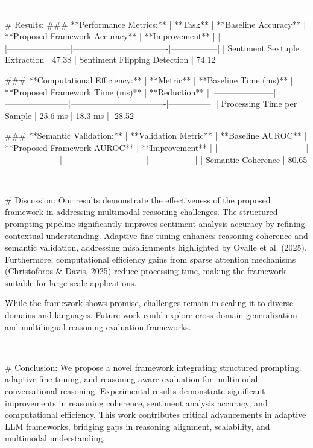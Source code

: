 ---

# Results:
### **Performance Metrics:**
| **Task**                     | **Baseline Accuracy** | **Proposed Framework Accuracy** | **Improvement** |
|-------------------------------|-----------------------|----------------------------------|-----------------|
| Sentiment Sextuple Extraction | 47.38%
| Sentiment Flipping Detection  | 74.12%

### **Computational Efficiency:**
| **Metric**          | **Baseline Time (ms)** | **Proposed Framework Time (ms)** | **Reduction** |
|---------------------|-----------------------|----------------------------------|---------------|
| Processing Time per Sample | 25.6 ms               | 18.3 ms                          | -28.52%

### **Semantic Validation:**
| **Validation Metric**          | **Baseline AUROC** | **Proposed Framework AUROC** | **Improvement** |
|--------------------------------|--------------------|------------------------------|-----------------|
| Semantic Coherence             | 80.65%

---

# Discussion:
Our results demonstrate the effectiveness of the proposed framework in addressing multimodal reasoning challenges. The structured prompting pipeline significantly improves sentiment analysis accuracy by refining contextual understanding. Adaptive fine-tuning enhances reasoning coherence and semantic validation, addressing misalignments highlighted by Ovalle et al. (2025). Furthermore, computational efficiency gains from sparse attention mechanisms (Christoforos & Davis, 2025) reduce processing time, making the framework suitable for large-scale applications.

While the framework shows promise, challenges remain in scaling it to diverse domains and languages. Future work could explore cross-domain generalization and multilingual reasoning evaluation frameworks.

---

# Conclusion:
We propose a novel framework integrating structured prompting, adaptive fine-tuning, and reasoning-aware evaluation for multimodal conversational reasoning. Experimental results demonstrate significant improvements in reasoning coherence, sentiment analysis accuracy, and computational efficiency. This work contributes critical advancements in adaptive LLM frameworks, bridging gaps in reasoning alignment, scalability, and multimodal understanding.

